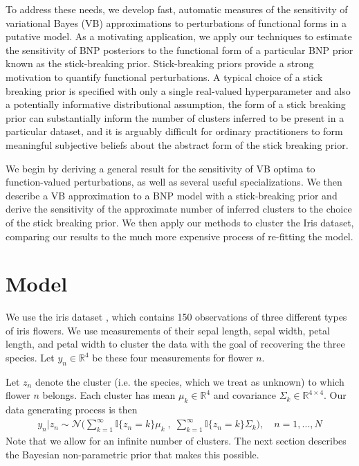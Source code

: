 \documentclass{article}
\begin{document}
To address these needs, we develop fast, automatic measures of the sensitivity
of variational Bayes (VB) approximations to perturbations of functional forms in
a putative model. As a motivating application, we apply our techniques to
estimate the sensitivity of BNP posteriors to the functional form of a
particular BNP prior known as the stick-breaking prior. Stick-breaking priors
provide a strong motivation to quantify functional perturbations. A typical
choice of a stick breaking prior is specified with only a single real-valued
hyperparameter and also a potentially informative distributional assumption, the
form of a stick breaking prior can substantially inform the number of clusters
inferred to be present in a particular dataset, and it is arguably difficult for
ordinary practitioners to form meaningful subjective beliefs about the abstract
form of the stick breaking prior.

We begin by deriving a general result for the sensitivity of VB optima to
function-valued perturbations, as well as several useful specializations. We
then describe a VB approximation to a BNP model with a stick-breaking prior and
derive the sensitivity of the approximate number of inferred clusters to the
choice of the stick breaking prior. We then apply our methods to cluster the
Iris \citep{iris_data_anderson, iris_data_fisher} dataset, comparing our results
to the much more expensive process of re-fitting the model.

\section{Model} We use the iris dataset \citep{iris_data_anderson,
iris_data_fisher}, which contains 150 observations of three different types of
iris flowers. We use measurements of their sepal length, sepal width, petal
length, and petal width to cluster the data with the goal of recovering the
three species. Let $y_{n}\in \mathbb{R}^4$ be these four measurements for flower
$n$.

Let $z_n$ denote the cluster (i.e. the species, which we treat as unknown) to
which flower $n$ belongs. Each cluster has mean $\mu_k\in \mathbb{R}^4$ and
covariance $\Sigma_k \in \mathbb{R}^{4\times 4}$. Our data generating process is
then
%
\begin{align}
	y_n | z_n \sim \mathcal{N}\Big(\sum_{k=1}^\infty \mathbb{I}\{z_n = k\} \mu_k \;,
              \; \sum_{k=1}^\infty \mathbb{I}\{z_n = k\} \Sigma_k\Big),
	\quad n = 1, ..., N
\end{align}
%
Note that we allow for an infinite number of clusters. The next section
describes the Bayesian non-parametric prior that makes this possible.
\end{document}
